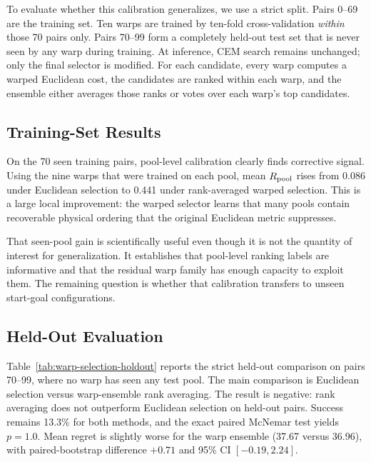 To evaluate whether this calibration generalizes, we use a strict split. Pairs 0--69 are the training set. Ten warps are trained by ten-fold cross-validation \emph{within} those 70 pairs only. Pairs 70--99 form a completely held-out test set that is never seen by any warp during training. At inference, CEM search remains unchanged; only the final selector is modified. For each candidate, every warp computes a warped Euclidean cost, the candidates are ranked within each warp, and the ensemble either averages those ranks or votes over each warp's top candidates.

\subsection{Training-Set Results}

On the 70 seen training pairs, pool-level calibration clearly finds corrective signal. Using the nine warps that were trained on each pool, mean $R_\text{pool}$ rises from 0.086 under Euclidean selection to 0.441 under rank-averaged warped selection. This is a large local improvement: the warped selector learns that many pools contain recoverable physical ordering that the original Euclidean metric suppresses.

That seen-pool gain is scientifically useful even though it is not the quantity of interest for generalization. It establishes that pool-level ranking labels are informative and that the residual warp family has enough capacity to exploit them. The remaining question is whether that calibration transfers to unseen start-goal configurations.

\subsection{Held-Out Evaluation}

Table~\ref{tab:warp-selection-holdout} reports the strict held-out comparison on pairs 70--99, where no warp has seen any test pool. The main comparison is Euclidean selection versus warp-ensemble rank averaging. The result is negative: rank averaging does not outperform Euclidean selection on held-out pairs. Success remains 13.3\% for both methods, and the exact paired McNemar test yields $p=1.0$. Mean regret is slightly worse for the warp ensemble (37.67 versus 36.96), with paired-bootstrap difference $+0.71$ and 95\% CI $[-0.19, 2.24]$.

